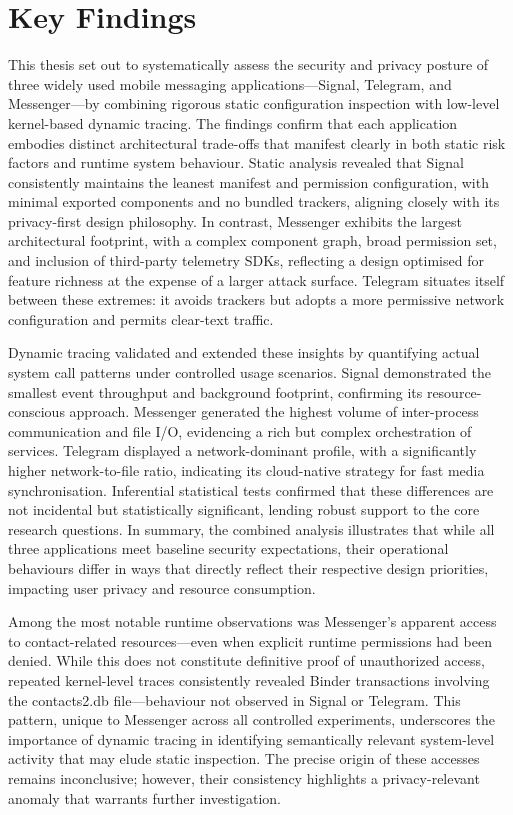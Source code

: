 \documentclass[a4paper,12pt]{report}
\begin{document}
\section{Key Findings}
This thesis set out to systematically assess the security and privacy posture of three widely used mobile messaging applications—Signal, Telegram, and Messenger—by combining rigorous static configuration inspection with low-level kernel-based dynamic tracing. The findings confirm that each application embodies distinct architectural trade-offs that manifest clearly in both static risk factors and runtime system behaviour. Static analysis revealed that Signal consistently maintains the leanest manifest and permission configuration, with minimal exported components and no bundled trackers, aligning closely with its privacy-first design philosophy. In contrast, Messenger exhibits the largest architectural footprint, with a complex component graph, broad permission set, and inclusion of third-party telemetry SDKs, reflecting a design optimised for feature richness at the expense of a larger attack surface. Telegram situates itself between these extremes: it avoids trackers but adopts a more permissive network configuration and permits clear-text traffic.

Dynamic tracing validated and extended these insights by quantifying actual system call patterns under controlled usage scenarios. Signal demonstrated the smallest event throughput and background footprint, confirming its resource-conscious approach. Messenger generated the highest volume of inter-process communication and file I/O, evidencing a rich but complex orchestration of services. Telegram displayed a network-dominant profile, with a significantly higher network-to-file ratio, indicating its cloud-native strategy for fast media synchronisation. Inferential statistical tests confirmed that these differences are not incidental but statistically significant, lending robust support to the core research questions. In summary, the combined analysis illustrates that while all three applications meet baseline security expectations, their operational behaviours differ in ways that directly reflect their respective design priorities, impacting user privacy and resource consumption.

Among the most notable runtime observations was Messenger’s apparent access to contact-related resources—even when explicit runtime permissions had been denied. While this does not constitute definitive proof of unauthorized access, repeated kernel-level traces consistently revealed Binder transactions involving the contacts2.db file—behaviour not observed in Signal or Telegram. This pattern, unique to Messenger across all controlled experiments, underscores the importance of dynamic tracing in identifying semantically relevant system-level activity that may elude static inspection. The precise origin of these accesses remains inconclusive; however, their consistency highlights a privacy-relevant anomaly that warrants further investigation.
\end{document}
